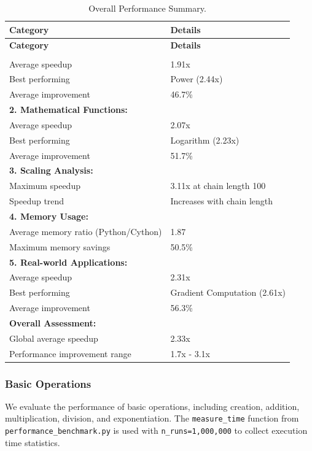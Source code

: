 \documentclass{article}
\begin{document}
\begin{longtable}{ll}
\caption{Overall Performance Summary.}\label{tab:overall_performance_summary}\\
\toprule
\textbf{Category} & \textbf{Details} \\
\midrule
\endfirsthead
\toprule
\textbf{Category} & \textbf{Details} \\
\midrule
\endhead
\bottomrule
\endfoot
\multicolumn{2}{l}{\textbf{1. Basic Operations:}} \\
Average speedup & 1.91x \\
Best performing & Power (2.44x) \\
Average improvement & 46.7\% \\
\midrule
\multicolumn{2}{l}{\textbf{2. Mathematical Functions:}} \\
Average speedup & 2.07x \\
Best performing & Logarithm (2.23x) \\
Average improvement & 51.7\% \\
\midrule
\multicolumn{2}{l}{\textbf{3. Scaling Analysis:}} \\
Maximum speedup & 3.11x at chain length 100 \\
Speedup trend & Increases with chain length \\
\midrule
\multicolumn{2}{l}{\textbf{4. Memory Usage:}} \\
Average memory ratio (Python/Cython) & 1.87 \\
Maximum memory savings & 50.5\% \\
\midrule
\multicolumn{2}{l}{\textbf{5. Real-world Applications:}} \\
Average speedup & 2.31x \\
Best performing & Gradient Computation (2.61x) \\
Average improvement & 56.3\% \\
\midrule
\multicolumn{2}{l}{\textbf{Overall Assessment:}} \\
Global average speedup & 2.33x \\
Performance improvement range & 1.7x - 3.1x \\
\bottomrule
\end{longtable}


\subsubsection*{Basic Operations}

We evaluate the performance of basic operations, including creation, addition, multiplication, division, and exponentiation. The \texttt{measure\_time} function from \texttt{performance\_benchmark.py} is used with \texttt{n\_runs=1,000,000} to collect execution time statistics.
\end{document}

